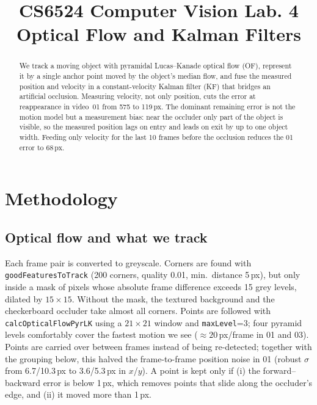 \documentclass[conference]{assets/latex/IEEEtran}
\begin{document}
\title{CS6524 Computer Vision Lab. 4\\ Optical Flow and Kalman Filters}

\author{
\and
{}
\and
{}
}

\maketitle

\begin{abstract}
We track a moving object with pyramidal Lucas--Kanade optical flow (OF), represent it by a single anchor point moved by the object's median flow, and fuse the measured position and velocity in a constant-velocity Kalman filter (KF) that bridges an artificial occlusion. Measuring velocity, not only position, cuts the error at reappearance in video~01 from 575 to 119\,px. The dominant remaining error is not the motion model but a measurement bias: near the occluder only part of the object is visible, so the measured position lags on entry and leads on exit by up to one object width. Feeding only velocity for the last 10 frames before the occlusion reduces the 01 error to 68\,px.
\end{abstract}

\section{Methodology}

\subsection{Optical flow and what we track}
Each frame pair is converted to greyscale. Corners are found with \texttt{goodFeaturesToTrack} (200 corners, quality 0.01, min.\ distance 5\,px), but only inside a mask of pixels whose absolute frame difference exceeds 15 grey levels, dilated by $15{\times}15$. Without the mask, the textured background and the checkerboard occluder take almost all corners. Points are followed with \texttt{calcOpticalFlowPyrLK} using a $21{\times}21$ window and \texttt{maxLevel}=3; four pyramid levels comfortably cover the fastest motion we see (${\approx}20$\,px/frame in 01 and 03). Points are carried over between frames instead of being re-detected; together with the grouping below, this halved the frame-to-frame position noise in 01 (robust $\sigma$ from 6.7/10.3\,px to 3.6/5.3\,px in $x$/$y$). A point is kept only if (i) the forward--backward error is below 1\,px, which removes points that slide along the occluder's edge, and (ii) it moved more than 1\,px.
\end{document}
